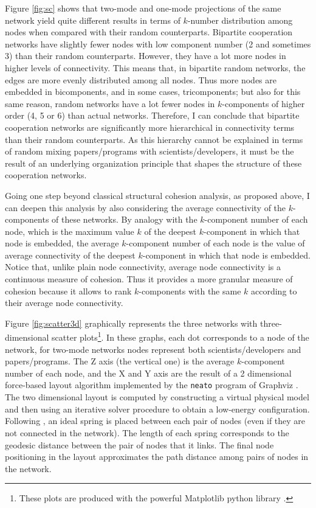 Figure \ref{fig:sc} shows that two-mode and one-mode projections of the same network yield quite different results in terms of $k$-number distribution among nodes when compared with their random counterparts. Bipartite cooperation networks have slightly fewer nodes with low component number (2 and sometimes 3) than their random counterparts. However, they have a lot more nodes in higher levels of connectivity. This means that, in bipartite random networks, the edges are more evenly distributed among all nodes. Thus more nodes are embedded in bicomponents, and in some cases, tricomponents; but also for this same reason, random networks have a lot fewer nodes in $k$-components of higher order (4, 5 or 6) than actual networks. Therefore, I can conclude that bipartite cooperation networks are significantly more hierarchical in connectivity terms than their random counterparts. As this hierarchy cannot be explained in terms of random mixing papers/programs with scientists/developers, it must be the result of an underlying organization principle that shapes the structure of these cooperation networks.

Going one step beyond classical structural cohesion analysis, as proposed above, I can deepen this analysis by also considering the average connectivity of the $k$-components of these networks. By analogy with the $k$-component number of each node, which is the maximum value $k$ of the deepest $k$-component in which that node is embedded, the average $k$-component number of each node is the value of average connectivity of the deepest $k$-component in which that node is embedded. Notice that, unlike plain node connectivity, average node connectivity is a continuous measure of cohesion. Thus it provides a more granular measure of cohesion because it allows to rank $k$-components with the same $k$ according to their average node connectivity.

Figure \ref{fig:scatter3d} graphically represents the three networks with three-dimensional scatter plots\footnote{These plots are produced with the powerful Matplotlib python library \citep{hunter:2007}.}.  In these graphs, each dot corresponds to a node of the network, for two-mode networks nodes represent both scientists/developers and papers/programs. The Z axis (the vertical one) is the average $k$-component number of each node, and the X and Y axis are the result of a 2 dimensional force-based layout algorithm implemented by the \texttt{neato} program of Graphviz \citep{graphviz}. The two dimensional layout is computed by constructing a virtual physical model and then using an iterative solver procedure to obtain a low-energy configuration. Following \citet{kamada:1989}, an ideal spring is placed between each pair of nodes (even if they are not connected in the network). The length of each spring corresponds to the geodesic distance between the pair of nodes that it links. The final node positioning in the layout approximates the path distance among pairs of nodes in the network.

